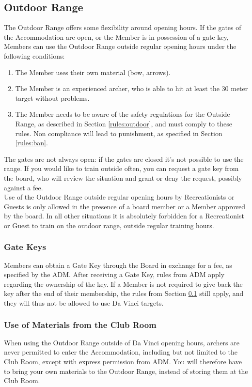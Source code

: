 \documentclass[a4paper]{article}
\begin{document}
\subsection{Outdoor Range}
\label{section:outdoor}
The Outdoor Range offers some flexibility around opening hours. If the gates of the Accommodation are open, or the Member is in possession of a gate key, Members can use the Outdoor Range outside regular opening hours under the following conditions:

\begin{enumerate}
\item The Member uses their own material (bow, arrows).
\item The Member is an experienced archer, who is able to hit at least the 30 meter target without problems.
\item The Member needs to be aware of the safety regulations for the Outside Range, as described in Section \ref{rules:outdoor}, and must comply to these rules. Non compliance will lead to punishment, as specified in Section \ref{rules:ban}.
\end{enumerate}

The gates are not always open: if the gates are closed it’s not possible to use the range. If you would like to train outside often, you can request a gate key from the board, who will review the situation and grant or deny the request, possibly against a fee. \\

Use of the Outdoor Range outside regular opening hours by Recreationists or Guests is only allowed in the presence of a board member or a Member approved by the board. In all other situations it is absolutely forbidden for a Recreationist or Guest to train on the outdoor range, outside regular training hours. 

\subsubsection{Gate Keys}
Members can obtain a Gate Key through the Board in exchange for a fee, as specified by the ADM. After receiving a Gate Key, rules from ADM apply regarding the ownership of the key. If a Member is not required to give back the key after the end of their membership, the rules from Section \ref{section:outdoor} still apply, and they will thus not be allowed to use Da Vinci targets.

\subsubsection{Use of Materials from the Club Room}
When using the Outdoor Range outside of Da Vinci opening hours, archers are never permitted to enter the Accommodation, including but not limited to the Club Room, except with express permission from ADM. You will therefore have to bring your own materials to the Outdoor Range, instead of storing them at the Club Room.
\end{document}
